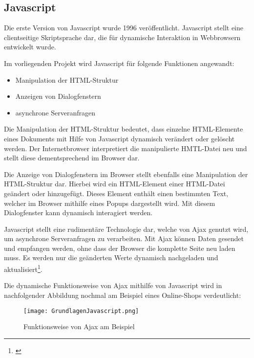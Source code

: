 \subsection{Javascript}
\label{sec:Javascript}

Die erste Version von Javascript wurde 1996 veröffentlicht. Javascript stellt eine clientseitige Skriptsprache dar, die für dynamische Interaktion in Webbrowsern entwickelt wurde.

Im vorliegenden Projekt wird Javascript für folgende Funktionen angewandt:

\begin{itemize}
  \item Manipulation der HTML-Struktur
  \item Anzeigen von Dialogfenstern
  \item asynchrone Serveranfragen
\end{itemize}

Die Manipulation der HTML-Struktur bedeutet, dass einzelne HTML-Elemente eines Dokuments mit Hilfe von Javascript dynamisch verändert oder gelöscht werden. Der Internetbrowser interpretiert die manipulierte HMTL-Datei neu und stellt diese dementsprechend im Browser dar.

Die Anzeige von Dialogfenstern im Browser stellt ebenfalls eine Manipulation der HTML-Struktur dar. Hierbei wird ein HTML-Element einer HTML-Datei geändert oder hinzugefügt. Dieses Element enthält einen bestimmten Text, welcher im Browser mithilfe eines Popups dargestellt wird. Mit diesem Dialogfenster kann dynamisch interagiert werden.

Javascript stellt eine rudimentäre Technologie dar, welche von Ajax genutzt wird, um asynchrone Serveranfragen zu verarbeiten. Mit Ajax können Daten gesendet und empfangen werden, ohne dass der Browser die komplette Seite neu laden muss.
Es werden nur die geänderten Werte dynamisch nachgeladen und aktualisiert\footnote{\citet[S.~104]{heinle2006}}.

Die dynamische Funktionsweise von Ajax mithilfe von Javascript wird in nachfolgender Abbildung nochmal am Beispiel eines Online-Shops verdeutlicht:

\begin{figure}[htb]
\centering
\texttt{[image: GrundlagenJavascript.png]}
\caption[Grundlagen Javascript]{Funktionsweise von Ajax am Beispiel\protect\footnotemark}
\label{fig:GrundlagendJavascript}
\end{figure}
